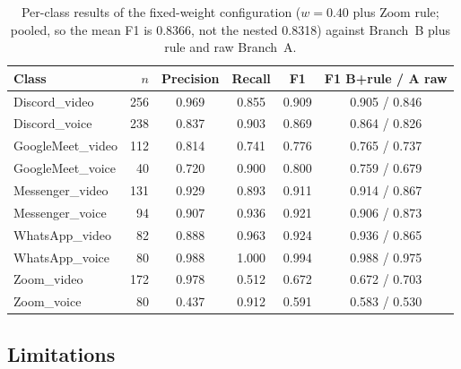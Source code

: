 \begin{table}[t]
\caption{Per-class results of the fixed-weight configuration ($w=0.40$ plus Zoom
rule; pooled, so the mean F1 is 0.8366, not the nested 0.8318) against Branch~B plus
rule and raw Branch~A.}
\label{tab:t3-perclass}
\centering
\begin{tabular}{lrcccc}
\hline
Class & $n$ & Precision & Recall & F1 & F1 B+rule / A raw \\
\hline
Discord\_video & 256 & 0.969 & 0.855 & 0.909 & 0.905 / 0.846 \\
Discord\_voice & 238 & 0.837 & 0.903 & 0.869 & 0.864 / 0.826 \\
GoogleMeet\_video & 112 & 0.814 & 0.741 & 0.776 & 0.765 / 0.737 \\
GoogleMeet\_voice & 40 & 0.720 & 0.900 & 0.800 & 0.759 / 0.679 \\
Messenger\_video & 131 & 0.929 & 0.893 & 0.911 & 0.914 / 0.867 \\
Messenger\_voice & 94 & 0.907 & 0.936 & 0.921 & 0.906 / 0.873 \\
WhatsApp\_video & 82 & 0.888 & 0.963 & 0.924 & 0.936 / 0.865 \\
WhatsApp\_voice & 80 & 0.988 & 1.000 & 0.994 & 0.988 / 0.975 \\
Zoom\_video & 172 & 0.978 & 0.512 & 0.672 & 0.672 / 0.703 \\
Zoom\_voice & 80 & 0.437 & 0.912 & 0.591 & 0.583 / 0.530 \\
\hline
\end{tabular}
\end{table}

\subsection{Limitations}
\label{sec:t3-limits}
 
